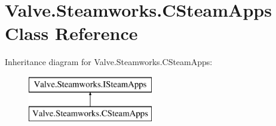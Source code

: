 \hypertarget{classValve_1_1Steamworks_1_1CSteamApps}{}\section{Valve.\+Steamworks.\+C\+Steam\+Apps Class Reference}
\label{classValve_1_1Steamworks_1_1CSteamApps}
Inheritance diagram for Valve.\+Steamworks.\+C\+Steam\+Apps\+:\begin{figure}[H]
\begin{center}
\leavevmode
\includegraphics[height=2.000000cm]{classValve_1_1Steamworks_1_1CSteamApps}
\end{center}
\end{figure}
